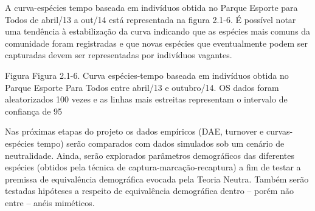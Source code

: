 A curva-espécies tempo baseada em indivíduos obtida no Parque Esporte para Todos de abril/13 a out/14 está representada na figura 2.1-6. É possível notar uma tendência à estabilização da curva indicando que as espécies mais comuns da comunidade foram registradas e que novas espécies que eventualmente podem ser capturadas devem ser representadas por indivíduos vagantes.

Figura
Figura 2.1-6. Curva espécies-tempo baseada em indivíduos obtida no Parque Esporte Para Todos entre abril/13 e outubro/14. OS dados foram aleatorizados 100 vezes e as linhas mais estreitas representam o intervalo de confiança de 95%

Nas próximas etapas do projeto os dados empíricos (DAE, turnover e curvas-espécies tempo) serão comparados com dados simulados sob um cenário de neutralidade. Ainda, serão explorados parâmetros demográficos das diferentes espécies (obtidos pela técnica de captura-marcação-recaptura) a fim de testar a premissa de equivalência demográfica evocada pela Teoria Neutra. Também serão testadas hipóteses a respeito de equivalência demográfica dentro – porém não entre – anéis miméticos.